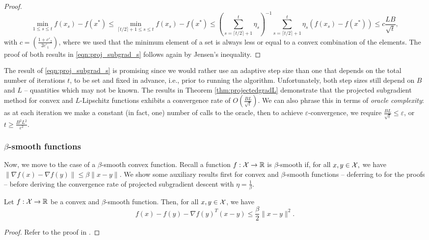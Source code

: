 \begin{theorem}
\begin{proof}
\[
\min_{1 \leq s \leq t} f(x_s) - f(x^*) \leq \min_{\lceil t /2 \rceil + 1 \leq s \leq t} f(x_s) - f(x^*) \leq \left(\sum_{s=\lceil t /2 \rceil + 1}^t \eta_s\right)^{-1}\sum_{s=\lceil t /2 \rceil + 1}^t \eta_s \left(f(x_s) - f(x^*)\right) \leq c\frac{LB}{\sqrt{t}},
\]
with $c=\left( \frac{1+c'_2}{2c'_1} \right)$, where we used that the minimum element of a set is always less or equal to a convex combination of the elements. The proof of both results in \eqref{eqn:proj_subgrad_s} follows again by Jensen's inequality.
\end{proof}
\end{theorem}

The result of \eqref{eqn:proj_subgrad_s} is promising since we would rather use an adaptive step size than one that depends on the total number of iterations $t$, to be set and fixed in advance, i.e., prior to running the algorithm. Unfortunately, both step sizes still depend on $B$ and $L$ -- quantities which may not be known. The results in Theorem \ref{thm:projectedgradL} demonstrate that the projected subgradient method for convex and $L$-Lipschitz functions exhibits a convergence rate of $O\left(\frac{BL}{\sqrt{t}}\right)$. We can also phrase this in terms of \emph{oracle complexity}: as at each iteration we make a constant (in fact, one) number of calls to the oracle, then to achieve $\varepsilon$-convergence, we require $\frac{BL}{\sqrt{t}} \le \varepsilon$, or $t\geq \frac{B^2 L^2}{\varepsilon^2}$.

\subsubsection{$\beta$-smooth functions}
Now, we move to the case of a $\beta$-smooth convex function. Recall a function $f: \mathcal{X} \rightarrow \mathbb{R}$ is $\beta$-smooth if, for all $x,y \in \mathcal{X},$ we have $\| \nabla f(x) - \nabla f(y) \| \leq \beta \| x - y \|$. We show some auxiliary results first for convex and $\beta$-smooth functions -- deferring to \cite{bubeck} for the proofs -- before deriving the convergence rate of projected subgradient descent with $\eta = \frac{1}{\beta}$.

\begin{lemma} \label{lem:cvx_beta_smooth}
Let $f : \mathcal{X} \rightarrow \mathbb{R}$ be a convex and $\beta$-smooth function. Then, for all $x, y \in \mathcal{X}$, we have 
\[
f(x) - f(y) - \nabla f(y)^T (x - y) \leq \frac{\beta}{2} \| x - y \|^2.
\]
\begin{proof}
Refer to the proof in \cite[Lemma~3.4]{bubeck}.
\end{proof}
\end{lemma} 

